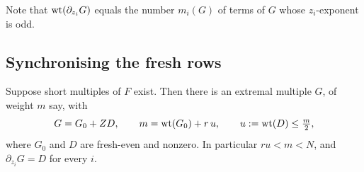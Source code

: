 Note that $\operatorname{wt}(\partial_{z_i}G)$ equals the number $m_i(G)$ of terms of $G$ whose $z_i$-exponent is odd.

\subsection{Synchronising the fresh rows}

\begin{proposition}\label{prop:normal-form}
Suppose short multiples of $F$ exist. Then there is an extremal multiple $G$, of weight $m$ say, with
\[
 G=G_0+Z D,\qquad m=\operatorname{wt}(G_0)+r\,u,\qquad u:=\operatorname{wt}(D)\le\tfrac m2,
\]
where $G_0$ and $D$ are fresh-even and nonzero.
In particular $ru<m<N$, and $\partial_{z_i}G=D$ for every $i$.
\end{proposition}

